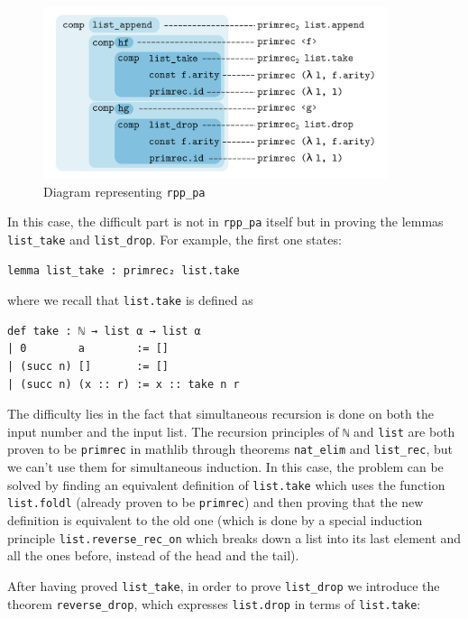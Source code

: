 \documentclass[preprint]{elsarticle}
\theoremstyle{remark}
\newcommand{\MATHLIB}{\textsf{mathlib}\xspace}
\begin{document}
\begin{figure}[H]
    \centering
    \includegraphics[width=0.9\textwidth]{drawing.png}
    \caption{Diagram representing \lstinline|rpp_pa|}
    \label{fig:rpp_pa}
\end{figure}

In this case, the difficult part is not in \lstinline|rpp_pa| itself but in proving the lemmas \lstinline|list_take| and \lstinline|list_drop|. For example, the first one states:

\begin{lstlisting}
lemma list_take : primrec₂ list.take
\end{lstlisting}

where we recall that \lstinline|list.take| is defined as

\begin{lstlisting}
def take : ℕ → list α → list α
| 0        a        := []
| (succ n) []       := []
| (succ n) (x :: r) := x :: take n r
\end{lstlisting}

The difficulty lies in the fact that simultaneous recursion is done on both the input number and the input list. The recursion principles of \lstinline{ℕ} and \lstinline|list| are both proven to be \lstinline|primrec| in \MATHLIB through theorems \lstinline{nat_elim} and \lstinline{list_rec}, but we can't use them for simultaneous induction. In this case, the problem can be solved by finding an equivalent definition of \lstinline|list.take| which uses the function \lstinline|list.foldl| (already proven to be \lstinline|primrec|) and then proving that the new definition is equivalent to the old one (which is done by a special induction principle \lstinline|list.reverse_rec_on| which breaks down a list into its last element and all the ones before, instead of the head and the tail).

After having proved \lstinline|list_take|, in order to prove \lstinline|list_drop| we introduce the theorem \lstinline|reverse_drop|, which expresses \lstinline|list.drop| in terms of \lstinline|list.take|:
\end{document}
